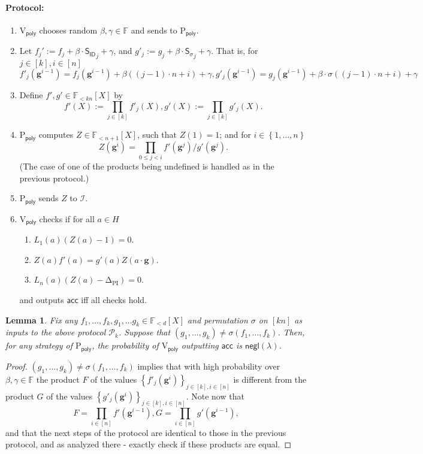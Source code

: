 \documentclass[11pt]{article} %
\newcommand{\F}{\ensuremath{\mathbb F}\xspace}
\newcommand{\sigof}[1]{\ensuremath{\sigma(#1)}\xspace}
\newcommand{\proverexp}{\ensuremath{\mathsf{e}}\xspace}
\newcommand{\pubinputdelta}{\ensuremath{\mathrm{\Delta_{\mathrm{PI}}}}\xspace}
\newcommand{\negl}{\ensuremath{\mathsf{negl}(\lambda)}\xspace}
\newcommand{\acc}{\ensuremath{\mathsf{acc}}\xspace}
\newcommand{\defeq}{:=}
\newcommand{\dom}{\ensuremath{H}\xspace}
\newcommand{\sett}[2]{\ensuremath{\set{#1}_{#2}}\xspace}
\newcommand{\prvpoly}{\ensuremath{\mathrm{P_{\mathsf{poly}}}}\xspace}
\newcommand{\verpoly}{\ensuremath{\mathrm{V_{\mathsf{poly}}}}\xspace}
\newcommand{\ideal}{\ensuremath{\mathcal{I}}\xspace}
\newcommand{\set}[1]{\ensuremath{\left\{#1\right\}}\xspace}
\newcommand{\hgen}{\ensuremath{\mathbf{g}}\xspace}
\newcommand{\polysofdeg}[1]{\ensuremath{\F_{< #1}[X]}\xspace}
\newcommand{\prot}{\ensuremath{\mathscr{P}}\xspace}
\newcommand{\sigpoly}{\ensuremath{\mathsf{S_{\sigma}}}\xspace}
\newcommand{\idpoly}{\ensuremath{\mathsf{S_{ID}}}\xspace}
\newtheorem{lemma}{Lemma}[section]
\newcommand{\protmany}{\ensuremath{ {\prot}_k}\xspace}
\begin{document}
\paragraph{Protocol:}
\begin{enumerate}
 \item\label{item:betgamma} \verpoly chooses random $\beta,\gamma \in\F$ and sends to \prvpoly.
 \item Let $f_j'\defeq f_j+\beta\cdot  \idpoly_j +\gamma$, and $ g'_j\defeq g_j+\beta\cdot \sigpoly_j + \gamma$.
That is, for $j\in [k],i\in [n]$
 \[f'_j(\hgen^{i-1}) = f_j(\hgen^{i-1}) + \beta((j-1)\cdot n + i) + \gamma,
 g'_j(\hgen^{i-1}) = g_j(\hgen^{i-1}) + \beta\cdot \sigma((j-1)\cdot n + i) + \gamma\]
\item Define $f',g' \in \polysofdeg{kn}$ by 
\[f'(X) \defeq \prod_{j\in [k]} f'_j(X),g'(X) \defeq \prod_{j\in [k]} g'_j(X).\]
 
 \item \prvpoly computes $Z \in \polysofdeg{n+1}$, such that 
 $Z(1) =1$; and for $i\in \set{1,\ldots,n}$
 \[Z(\hgen^i)  = \prod_{0\leq j <i} f'(\hgen^j)/g'(\hgen^j).\]
 (The case of one of the products being undefined is handled as in the previous protocol.)
 
 
 \item \prvpoly sends $Z$ to \ideal.
 \item \verpoly checks if for all $a\in \dom$
 \begin{enumerate}
  \item $L_1(a) (Z(a)-1) =0$.
  \item $Z(a)f'(a) = g'(a)Z(a\cdot \hgen)$.
  \item $L_n(a)(Z(a)-\pubinputdelta)=0$.
 \end{enumerate}
 and outputs \acc iff all checks hold.
\end{enumerate}
\begin{lemma}\label{lem:permprotocolmany}
Fix any $f_1,\ldots,f_k,g_1,\ldots g_k \in \polysofdeg{d}$ and permutation $\sigma$ on $[kn]$ as inputs to the above protocol \protmany.
Suppose that $(g_1,\ldots,g_k) \neq \sigof{f_1,\ldots,f_k}$.
Then, for any strategy of \prvpoly, the probability of \verpoly outputting \acc is \negl.

\end{lemma}
\begin{proof}
 $(g_1,\ldots,g_k) \neq \sigof{f_1,\ldots,f_k}$ implies that with high probability over $\beta,\gamma \in \F$ the product $F$ of the values 
 \sett{f'_j(\hgen^i)}{j\in [k],i\in [n]} is different from the product $G$ of the values
 \sett{g'_j(\hgen^i)}{j\in [k],i\in [n]}.
 Note now that 
    \[F=\prod_{i\in [n]} f'(\hgen^{i-1}), G=\prod_{i\in [n]} g'(\hgen^{i-1}),\]
 and that the next steps of the protocol are identical to those in the previous protocol,
 and as analyzed there - exactly check if these products are equal.
\end{proof}
 
\end{document}
